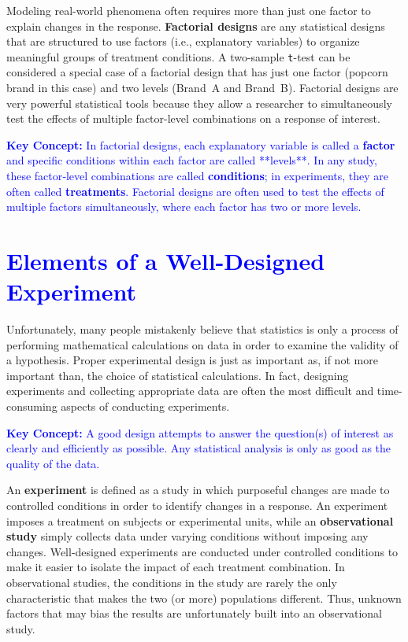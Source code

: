 \documentclass[
]{report}
\begin{document}
Modeling real-world phenomena often requires more than just one factor to explain changes in the response. \textbf{Factorial designs} are any statistical designs that are structured to use factors (i.e., explanatory variables) to organize meaningful groups of treatment conditions. A two-sample \texttt{t}-test can be considered a special case of a factorial design that has just one factor (popcorn brand in this case) and two levels (Brand~A and Brand~B). Factorial designs are very powerful statistical tools because they allow a researcher to simultaneously test the effects of multiple factor-level combinations on a response of interest.

\textbf{\textcolor{blue}{Key Concept:}} \textcolor{blue} {In factorial designs, each explanatory variable is called a \textbf{factor} and specific conditions within each factor are called **levels**. In any study, these factor‑level combinations are called \textbf{conditions}; in experiments, they are often called \textbf{treatments}. Factorial designs are often used to test the effects of multiple factors simultaneously, where each factor has two or more levels.}

\hypertarget{section-40}{%
\section{\texorpdfstring{\textcolor{blue}{Elements of a Well-Designed Experiment}}{}}\label{section-40}}

Unfortunately, many people mistakenly believe that statistics is only a process of performing mathematical calculations on data in order to examine the validity of a hypothesis. Proper experimental design is just as important as, if not more important than, the choice of statistical calculations. In fact, designing experiments and collecting appropriate data are often the most difficult and time-consuming aspects of conducting experiments.

\textbf{\textcolor{blue}{Key Concept:}} \textcolor{blue}{A good design attempts to answer the question(s) of interest as clearly and efficiently as possible. Any statistical analysis is only as good as the quality of the data.}

An \textbf{experiment} is defined as a study in which purposeful changes are made to controlled conditions in order to identify changes in a response. An experiment imposes a treatment on subjects or experimental units, while an \textbf{observational study} simply collects data under varying conditions without imposing any changes. Well-designed experiments are conducted under controlled conditions to make it easier to isolate the impact of each treatment combination. In observational studies, the conditions in the study are rarely the only characteristic that makes the two (or more) populations different. Thus, unknown factors that may bias the results are unfortunately built into an observational study.
\end{document}
